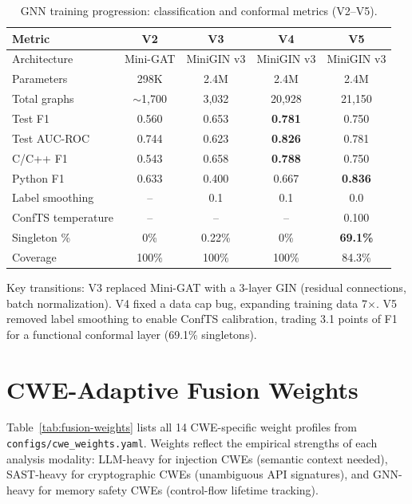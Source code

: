 \begin{table}[H]
\centering
{\small
\caption{GNN training progression: classification and conformal metrics (V2--V5).}
\label{tab:gnn-summary}
\begin{tabular}{lcccc}
\toprule
\textbf{Metric} & \textbf{V2} & \textbf{V3} & \textbf{V4} & \textbf{V5} \\
\midrule
Architecture & Mini-GAT & MiniGIN v3 & MiniGIN v3 & MiniGIN v3 \\
Parameters & 298K & 2.4M & 2.4M & 2.4M \\
Total graphs & $\sim$1,700 & 3,032 & 20,928 & 21,150 \\
\midrule
Test F1 & 0.560 & 0.653 & \textbf{0.781} & 0.750 \\
Test AUC-ROC & 0.744 & 0.623 & \textbf{0.826} & 0.781 \\
C/C++ F1 & 0.543 & 0.658 & \textbf{0.788} & 0.750 \\
Python F1 & 0.633 & 0.400 & 0.667 & \textbf{0.836} \\
\midrule
Label smoothing & -- & 0.1 & 0.1 & 0.0 \\
ConfTS temperature & -- & -- & -- & 0.100 \\
Singleton \% & 0\% & 0.22\% & 0\% & \textbf{69.1\%} \\
Coverage & 100\% & 100\% & 100\% & 84.3\% \\
\bottomrule
\end{tabular}
}
\end{table}

Key transitions: V3 replaced Mini-GAT with a 3-layer GIN (residual connections, batch normalization). V4 fixed a data cap bug, expanding training data 7$\times$. V5 removed label smoothing to enable ConfTS calibration, trading 3.1 points of F1 for a functional conformal layer (69.1\% singletons).

\section{CWE-Adaptive Fusion Weights}
\label{app:fusion-weights}

Table~\ref{tab:fusion-weights} lists all 14 CWE-specific weight profiles from \texttt{configs/cwe\_weights.yaml}. Weights reflect the empirical strengths of each analysis modality: LLM-heavy for injection CWEs (semantic context needed), SAST-heavy for cryptographic CWEs (unambiguous API signatures), and GNN-heavy for memory safety CWEs (control-flow lifetime tracking).

